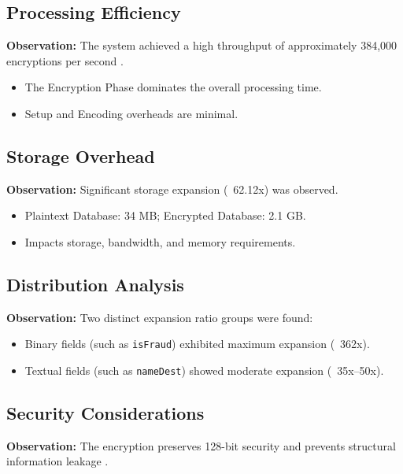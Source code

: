 \subsection{Processing Efficiency}

\textbf{Observation:} The system achieved a high throughput of approximately 384,000 encryptions per second \cite{zhao2025vlwe}.

\begin{itemize}
    \item The Encryption Phase dominates the overall processing time.
    \item Setup and Encoding overheads are minimal.
\end{itemize}

\subsection{Storage Overhead}

\textbf{Observation:} Significant storage expansion (~62.12x) was observed.

\begin{itemize}
    \item Plaintext Database: 34 MB; Encrypted Database: 2.1 GB.
    \item Impacts storage, bandwidth, and memory requirements.
\end{itemize}

\subsection{Distribution Analysis}

\textbf{Observation:} Two distinct expansion ratio groups were found:

\begin{itemize}
    \item Binary fields (such as \texttt{isFraud}) exhibited maximum expansion (~362x).
    \item Textual fields (such as \texttt{nameDest}) showed moderate expansion (~35x--50x).
\end{itemize}

\subsection{Security Considerations}

\textbf{Observation:} The encryption preserves 128-bit security and prevents structural information leakage \cite{cryptoeprint:2024/2041}.

